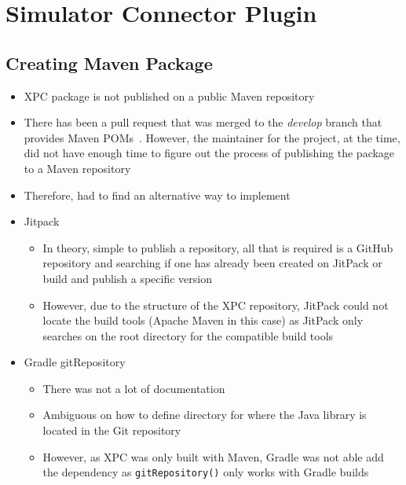 \documentclass[../dissertation.tex]{subfiles}
\begin{document}
\section{Simulator Connector Plugin}


\subsection{Creating Maven Package}
\begin{itemize}
  \item XPC package is not published on a public Maven repository
  \item There has been a pull request that was merged to the \textit{develop} branch
    that provides Maven POMs~\cite{xpc:pom}. However, the maintainer for the
    project, at the time, did not have enough time to figure out the process of
    publishing the package to a Maven repository~\cite{xpc:pom-time}
  \item Therefore, had to find an alternative way to implement
  \item Jitpack~\cite{jitpack}
  \begin{itemize}
    \item In theory, simple to publish a repository, all that is required is a GitHub
      repository and searching if one has already been created on JitPack or build and publish
      a specific version
    \item However, due to the structure of the XPC repository, JitPack could not locate the
      build tools (Apache Maven in this case) as JitPack only searches on the root directory
      for the compatible build tools
  \end{itemize}
  \item Gradle gitRepository~\cite{gradle:gitRepository}
  \begin{itemize}
    \item There was not a lot of documentation
    \item Ambiguous on how to define directory for where the Java library is located in the Git repository
    \item However, as XPC was only built with Maven, Gradle was not able add the dependency as \lstinline|gitRepository()|
      only works with Gradle builds~\cite{gradle:gitRepoGradleOnly}
  \end{itemize}

\end{itemize}
\end{document}
